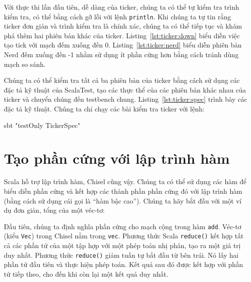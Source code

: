 \documentclass[%
    10pt,
    headinclude, footexclude,
    openright, %
    notitlepage,
    cleardoubleempty,
    headsepline,
    pointlessnumbers,
    bibtotoc, idxtotoc,
    ]{scrbook}
\newcommand{\code}[1]{{\small{\texttt{#1}}}}
\begin{document}

Với thực thi lần đầu tiên, dễ dàng của ticker, chúng ta có thể tự kiểm tra trình kiểm tra, có thể bằng cách gỡ lỗi với lệnh \code{println}. Khi chúng ta tự tin rằng ticker đơn giản và trình kiểm tra là chính xác, chúng ta có thể tiếp tục và khám phá thêm hai phiên bản khác của ticker. Listing~\ref{lst:ticker:down} biểu diễn việc tạo tick với mạch đếm xuống đến 0. Listing~\ref{lst:ticker:nerd} biểu diễn phiên bản Nerd đếm xuống đến -1 nhằm sử dụng ít phần cứng hơn bằng cách tránh dùng mạch so sánh. 



Chúng ta có thể kiểm tra tất cả ba phiên bản của ticker bằng cách sử dụng các đặc tả kỹ thuật của ScalaTest, tạo các thực thể của các phiên bản khác nhau của ticker và chuyển chúng đến testbench chung. Listing~\ref{lst:ticker:spec} trình bày các đặc tả kỹ thuật. Chúng ta chỉ chạy các bài kiểm tra ticker với lệnh: 

\begin{chisel}
sbt "testOnly TickerSpec"
\end{chisel}


\section{Tạo phần cứng với lập trình hàm}
\label{sec:functional}


Scala hỗ trợ lập trình hàm, Chisel cũng vậy. Chúng ta có thể sử dụng các hàm để biểu diễn phần cứng và kết hợp các thành phần phần cứng đó với lập trình hàm (bằng cách sử dụng cái gọi là ``hàm bậc cao''). Chúng ta hãy bắt đầu với một ví dụ đơn giản, tổng của một véc-tơ: 


\noindent Đầu tiên, chúng ta định nghĩa phần cứng cho mạch cộng trong hàm \code {add}. Véc-tơ (kiểu \code{Vec}) trong Chisel nằm trong \code{vec}. Phương thức Scala \code{reduce()} kết hợp tất cả các phần tử của một tập hợp với một phép toán nhị phân, tạo ra một giá trị duy nhất. Phương thức \code{reduce()} giảm tuần tự bắt đầu từ bên trái. Nó lấy hai phần tử đầu tiên và thực hiện phép toán. Kết quả sau đó được kết hợp với phần tử tiếp theo, cho đến khi còn lại một kết quả duy nhất.
\end{document}
